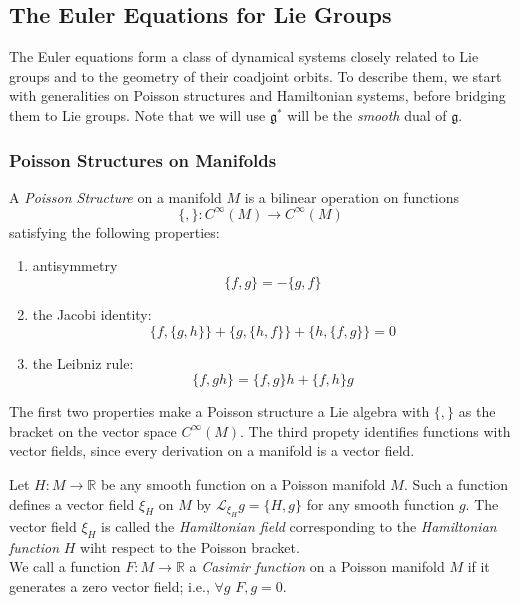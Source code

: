 \subsection{The Euler Equations for Lie Groups}


The Euler equations form a class of dynamical systems closely related to Lie groups and to the geometry of their coadjoint orbits. To describe them, we start with generalities on Poisson structures and Hamiltonian systems, before bridging them to Lie groups. Note that we will use $ \mathfrak{g}^*$ will be the \textit{smooth} dual of $ \mathfrak{g}$.

\subsubsection{Poisson Structures on Manifolds}


\begin{defn}

A \textit{Poisson Structure} on a manifold $M$ is a bilinear operation on functions\[
	\{ , \} : C^{\infty}(M) \to C^{\infty}(M)
\]
satisfying the following properties:
\begin{enumerate}
\item antisymmetry
	\[ \{ f,g \} = - \{ g,f \} 	\]
\item the Jacobi identity:
	\[	\{ f, \{ g,h \}  \} + \{ g, \{ h,f \}  \} + \{ h, \{ f,g \}  \} =0\]
\item the Leibniz rule:
	\[ \{ f, gh \} = \{ f,g \} h + \{ f,h \} g	\]
\end{enumerate}
The first two properties make a Poisson structure a Lie algebra with $ \{ , \} $ as the bracket on the vector space $C^{\infty}(M)$. The third propety identifies functions with vector fields, since every derivation on a manifold is a vector field.
\end{defn}


\begin{defn}

	Let $ H: M \to \mathbb{R}$ be any smooth function on a Poisson manifold $M$. Such a function defines a vector field $\xi_H$ on $M$ by $\mathcal{L}_{\xi_H} g = \{ H,g \} $ for any smooth function $g$. The vector field $\xi_H$ is called the \textit{Hamiltonian field} corresponding to the \textit{Hamiltonian function} $H$ wiht respect to the Poisson bracket.\\
	\indent We call a function $ F: M \to \mathbb{R}$ a \textit{Casimir function} on a Poisson manifold $M$ if it generates a zero vector field; i.e., $\forall g \hspace{4pt} {F,g}=0$.

\end{defn}


